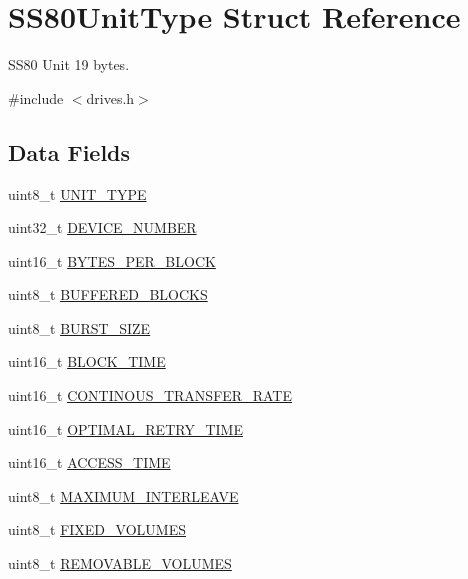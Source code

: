 \hypertarget{structSS80UnitType}{}\section{S\+S80\+Unit\+Type Struct Reference}
\label{structSS80UnitType}


S\+S80 Unit 19 bytes.  




{\ttfamily \#include $<$drives.\+h$>$}

\subsection*{Data Fields}
\begin{DoxyCompactItemize}
\item 
uint8\+\_\+t \hyperlink{structSS80UnitType_ae00e42430682e849d83b1ca4c8f44013}{U\+N\+I\+T\+\_\+\+T\+Y\+PE}
\item 
uint32\+\_\+t \hyperlink{structSS80UnitType_a69cad18aab93449fbd91445c4ba62928}{D\+E\+V\+I\+C\+E\+\_\+\+N\+U\+M\+B\+ER}
\item 
uint16\+\_\+t \hyperlink{structSS80UnitType_a18a5f03be6bea14c6c4a1f9b952bb160}{B\+Y\+T\+E\+S\+\_\+\+P\+E\+R\+\_\+\+B\+L\+O\+CK}
\item 
uint8\+\_\+t \hyperlink{structSS80UnitType_a575a381fe873ba8ba9aa4630673516a4}{B\+U\+F\+F\+E\+R\+E\+D\+\_\+\+B\+L\+O\+C\+KS}
\item 
uint8\+\_\+t \hyperlink{structSS80UnitType_a4bc66bc02c06dbfe279be6d2af808a04}{B\+U\+R\+S\+T\+\_\+\+S\+I\+ZE}
\item 
uint16\+\_\+t \hyperlink{structSS80UnitType_ab94c4b75c74e08e128d4802f5dec0dd5}{B\+L\+O\+C\+K\+\_\+\+T\+I\+ME}
\item 
uint16\+\_\+t \hyperlink{structSS80UnitType_a0486673977da185f2f69aaff378f81a2}{C\+O\+N\+T\+I\+N\+O\+U\+S\+\_\+\+T\+R\+A\+N\+S\+F\+E\+R\+\_\+\+R\+A\+TE}
\item 
uint16\+\_\+t \hyperlink{structSS80UnitType_ab7ae848f0a65aa2e29b613bc110c9085}{O\+P\+T\+I\+M\+A\+L\+\_\+\+R\+E\+T\+R\+Y\+\_\+\+T\+I\+ME}
\item 
uint16\+\_\+t \hyperlink{structSS80UnitType_ab43ef110f145d428fff831afc18f5e24}{A\+C\+C\+E\+S\+S\+\_\+\+T\+I\+ME}
\item 
uint8\+\_\+t \hyperlink{structSS80UnitType_ab215c7a9a84d0d5003a2dcfbd18e4b7d}{M\+A\+X\+I\+M\+U\+M\+\_\+\+I\+N\+T\+E\+R\+L\+E\+A\+VE}
\item 
uint8\+\_\+t \hyperlink{structSS80UnitType_ae1d52bfc5a9bdb8f6f26ba6dffd7c2f6}{F\+I\+X\+E\+D\+\_\+\+V\+O\+L\+U\+M\+ES}
\item 
uint8\+\_\+t \hyperlink{structSS80UnitType_a6dcef2939bd0a19951ad1592b1ec8c31}{R\+E\+M\+O\+V\+A\+B\+L\+E\+\_\+\+V\+O\+L\+U\+M\+ES}
\end{DoxyCompactItemize}



